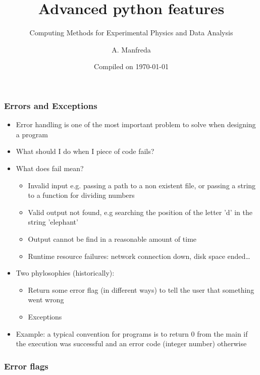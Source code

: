 \documentclass[9pt]{beamer}
\title{Advanced python features}
\subtitle{Computing Methods for Experimental Physics and Data Analysis}
\date{Compiled on \today}
\author{A. Manfreda}
\institute[INFN]{INFN--Pisa}
\begin{document}
\titleframe

\begin{frame}
  \frametitle{Errors and Exceptions}
  \begin{itemize}
    \item \alert{Error handling} is one of the most important problem to solve when designing a program
    \item What should I do when I piece of code fails?
    \item What does fail mean?
    \begin {itemize}
      \item Invalid input e.g. passing a path to a non existent file, or passing a string to a function for dividing numbers
      \item Valid output not found, e.g searching the position of the letter 'd' in the string 'elephant'
      \item Output cannot be find in a reasonable amount of time
      \item Runtime resource failures: network connection down, disk space ended\dots
    \end{itemize}
    \item Two phylosophies (historically):
    \begin{itemize}
      \item Return some \alert{error flag} (in different ways) to tell the user that something went wrong
      \item \alert{Exceptions}
    \end{itemize}
    \item Example: a typical convention for programs is to return 0 from the main if the execution was successful and an
          error code (integer number) otherwise
  \end{itemize}
\end{frame}


\begin{frame}
  \frametitle{Error flags}
  
\end{frame}
\end{document}
